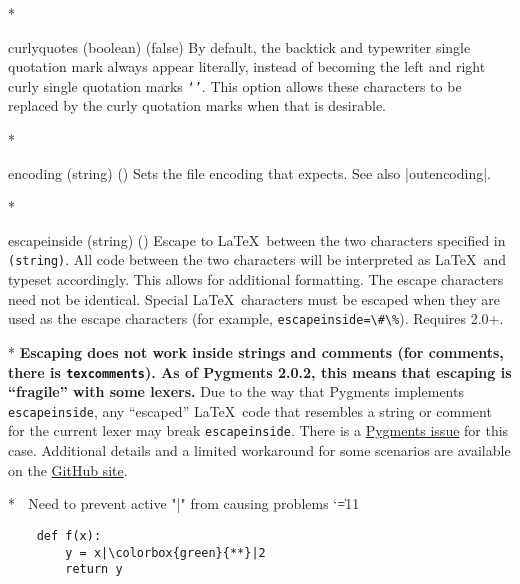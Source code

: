 \begin{paracol}{2}
\begin{optionlist}
    \switchcolumn[0]*%
\item[curlyquotes (boolean) (false)]
By default, the backtick \texttt{\textasciigrave} and typewriter single quotation mark \texttt{\textquotesingle} always appear literally, instead of becoming the left and right curly single quotation marks \texttt{`'}.  This option allows these characters to be replaced by the curly quotation marks when that is desirable.
\switchcolumn

\switchcolumn[0]*%
  \item[encoding (string) (\meta{system-specific})]
    Sets the file encoding that  expects.  See also |outencoding|.
    \switchcolumn

\switchcolumn[0]*%
  \item[escapeinside (string) (\meta{none})]
  Escape to \LaTeX\ between the two characters specified in \texttt{\string(string\string)}.  All code between the two characters will be interpreted as \LaTeX\ and typeset accordingly.  This allows for additional formatting.  The escape characters need not be identical.  Special \LaTeX\ characters must be escaped when they are used as the escape characters (for example, \texttt{escapeinside=\textbackslash\#\textbackslash\%}).  Requires  2.0+.
  \switchcolumn

  \switchcolumn[0]*%
\textbf{Escaping does not work inside strings and comments (for comments, there is \texttt{texcomments}).  As of Pygments 2.0.2, this means that escaping is ``fragile'' with some lexers.}  Due to the way that Pygments implements \texttt{escapeinside}, any ``escaped'' \LaTeX\ code that resembles a string or comment for the current lexer may break \texttt{escapeinside}.  There is a \href{https://bitbucket.org/birkenfeld/pygments-main/issue/1118}{Pygments issue} for this case.  Additional details and a limited workaround for some scenarios are available on the \href{https://github.com/gpoore/minted/issues/70#issuecomment-111729930}{ GitHub site}.
\switchcolumn

\switchcolumn[0]*%
\begingroup  ^^A Need to prevent active "|" from causing problems
\catcode`\|=11
\begin{example}
    \begin{verbatim}
    def f(x):
        y = x|\colorbox{green}{**}|2
        return y
    \end{verbatim}
\end{example}
\endgroup


\end{optionlist}
\end{paracol}
